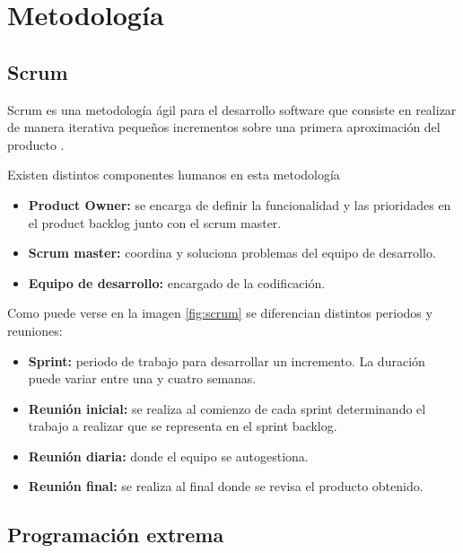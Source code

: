 
\section{Metodología}\label{metodologia}

\subsection{Scrum}

Scrum es una metodología ágil para el desarrollo software que consiste en realizar de manera iterativa pequeños incrementos sobre una primera aproximación del producto \cite{scrum:info2}. 

Existen distintos componentes humanos en esta metodología \cite{scrum:info}

\begin{itemize}
\tightlist
\item
  \textbf{Product Owner:} se encarga de definir la funcionalidad y las prioridades en el product backlog junto con el scrum master.
\item
  \textbf{Scrum master:} coordina y soluciona problemas del equipo de desarrollo.
\item
  \textbf{Equipo de desarrollo:} encargado de la codificación. 
\end{itemize}

Como puede verse en la imagen \ref{fig:scrum} se diferencian distintos periodos y reuniones:

\begin{itemize}
\tightlist
\item
  \textbf{Sprint:} periodo de trabajo para desarrollar un incremento. La duración puede variar entre una y cuatro semanas.
\item
  \textbf{Reunión inicial:} se realiza al comienzo de cada sprint determinando el trabajo a realizar que se representa en el sprint backlog.
\item
  \textbf{Reunión diaria:} donde el equipo se autogestiona.
\item
  \textbf{Reunión final:} se realiza al final donde se revisa el producto obtenido.
\end{itemize}


\subsection{Programación extrema}

